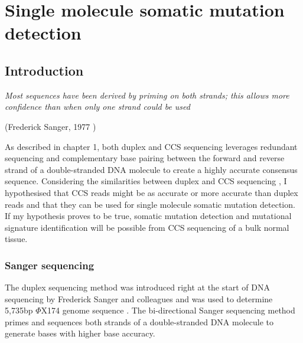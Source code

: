 
\chapter{Single molecule somatic mutation detection}

\ifpdf
    \graphicspath{{Chapter2/Figs/Raster/}{Chapter2/Figs/PDF/}{Chapter2/Figs/}}
\else
    \graphicspath{{Chapter2/Figs/Vector/}{Chapter2/Figs/}}
\fi

\section{Introduction}

\textit{Most sequences have been derived by priming on both strands; this allows more confidence than when only one strand could be used} 
\begin{flushright} (Frederick Sanger, 1977 \cite{Sanger1977-os}) \end{flushright}


As described in chapter 1, both duplex and CCS sequencing leverages redundant sequencing and complementary base pairing between the forward and reverse strand of a double-stranded DNA molecule to create a highly accurate consensus sequence. Considering the similarities between duplex and CCS sequencing \cite{Schmitt2012-yr, Hoang2016-jx, Abascal2021-pk}, I hypothesised that CCS reads might be as accurate or more accurate than duplex reads and that they can be used for single molecule somatic mutation detection. If my hypothesis proves to be true, somatic mutation detection and mutational signature identification will be possible from CCS sequencing of a bulk normal tissue. 

\subsection{Sanger sequencing}

The duplex sequencing method was introduced right at the start of DNA sequencing by Frederick Sanger and colleagues and was used to determine 5,735bp $\Phi$X174 genome sequence \cite{Sanger1977-os}. The bi-directional Sanger sequencing method primes and sequences both strands of a double-stranded DNA molecule to generate bases with higher base accuracy. 

